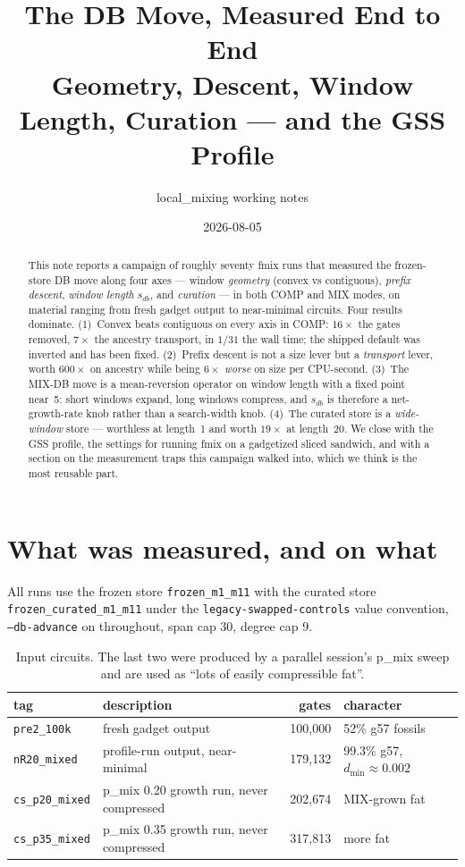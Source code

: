 \documentclass[11pt]{article}
\title{The DB Move, Measured End to End\\
\large Geometry, Descent, Window Length, Curation --- and the GSS Profile}
\author{local\_mixing working notes}
\date{2026-08-05}
\newcommand{\code}[1]{\texttt{#1}}
\begin{document}
\maketitle

\begin{abstract}
This note reports a campaign of roughly seventy fmix runs that measured the
frozen-store DB move along four axes --- window \emph{geometry} (convex vs
contiguous), \emph{prefix descent}, \emph{window length} $s_{db}$, and
\emph{curation} --- in both COMP and MIX modes, on material ranging from
fresh gadget output to near-minimal circuits. Four results dominate.
(1)~Convex beats contiguous on every axis in COMP: $16\times$ the gates
removed, $7\times$ the ancestry transport, in $1/31$ the wall time; the
shipped default was inverted and has been fixed. (2)~Prefix descent is not a
size lever but a \emph{transport} lever, worth $600\times$ on ancestry while
being $6\times$ \emph{worse} on size per CPU-second. (3)~The MIX-DB move is a
mean-reversion operator on window length with a fixed point near~5: short
windows expand, long windows compress, and $s_{db}$ is therefore a
net-growth-rate knob rather than a search-width knob. (4)~The curated store
is a \emph{wide-window} store --- worthless at length~1 and worth $19\times$
at length~20. We close with the GSS profile, the settings for running fmix on
a gadgetized sliced sandwich, and with a section on the measurement traps
this campaign walked into, which we think is the most reusable part.
\end{abstract}

\tableofcontents
\newpage

\section{What was measured, and on what}

All runs use the frozen store \code{frozen\_m1\_m11} with the curated store
\code{frozen\_curated\_m1\_m11} under the \code{legacy-swapped-controls} value
convention, \code{--db-advance} on throughout, span cap 30, degree cap 9.

\begin{table}[h]\centering\small
\begin{tabular}{llrl}
\toprule
tag & description & gates & character \\
\midrule
\code{pre2\_100k} & fresh gadget output & 100{,}000 & 52\% g57 fossils \\
\code{nR20\_mixed} & profile-run output, near-minimal & 179{,}132 & 99.3\% g57, $d_{\min}\approx0.002$ \\
\code{cs\_p20\_mixed} & p\_mix 0.20 growth run, never compressed & 202{,}674 & MIX-grown fat \\
\code{cs\_p35\_mixed} & p\_mix 0.35 growth run, never compressed & 317{,}813 & more fat \\
\bottomrule
\end{tabular}
\caption{Input circuits. The last two were produced by a parallel session's
p\_mix sweep and are used as ``lots of easily compressible fat''.}
\end{table}
\end{document}
